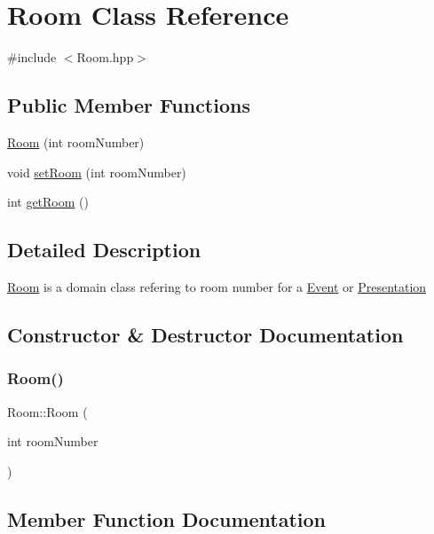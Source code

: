 \hypertarget{class_room}{}\section{Room Class Reference}
\label{class_room}


{\ttfamily \#include $<$Room.\+hpp$>$}

\subsection*{Public Member Functions}
\begin{DoxyCompactItemize}
\item 
\mbox{\hyperlink{class_room_ad69bed5f7349a46fef507c5b578da770}{Room}} (int room\+Number)
\item 
void \mbox{\hyperlink{class_room_ae1645c6cc522f4b1c0ba980736cb440d}{set\+Room}} (int room\+Number)
\item 
int \mbox{\hyperlink{class_room_a1debd51acccea50674c56fd77b9d3f1f}{get\+Room}} ()
\end{DoxyCompactItemize}


\subsection{Detailed Description}
\mbox{\hyperlink{class_room}{Room}} is a domain class refering to room number for a \mbox{\hyperlink{class_event}{Event}} or \mbox{\hyperlink{class_presentation}{Presentation}} 

\subsection{Constructor \& Destructor Documentation}
\mbox{\label{class_room_ad69bed5f7349a46fef507c5b578da770}} 
\subsubsection{\texorpdfstring{Room()}{Room()}}
{\footnotesize\ttfamily Room\+::\+Room (\begin{DoxyParamCaption}\item[{int}]{room\+Number }\end{DoxyParamCaption})}



\subsection{Member Function Documentation}
\mbox{\label{class_room_a1debd51acccea50674c56fd77b9d3f1f}} 
